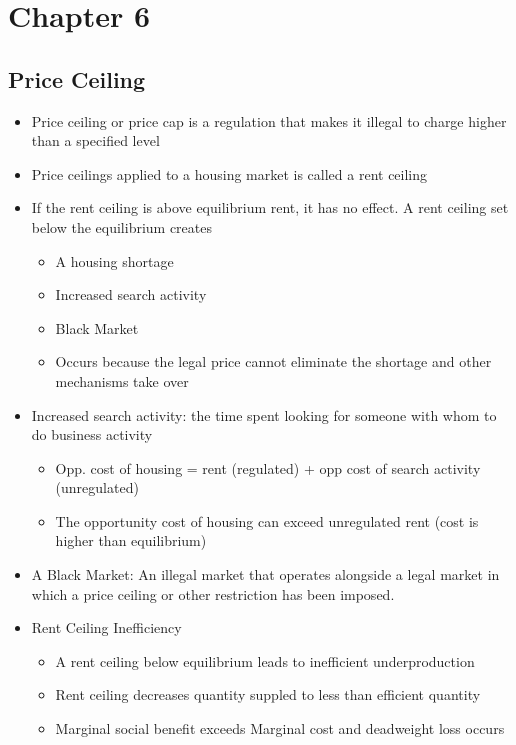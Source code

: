 \documentclass[11pt]{article}
\author{Sudhan Chitgopkar}
\date{\today}
\title{}
\begin{document}
\tableofcontents

\section{Chapter 6}
\label{sec:org15f45b9}
\subsection{Price Ceiling}
\label{sec:org0d3586f}
\begin{itemize}
\item Price ceiling or price cap is a regulation that makes it illegal to charge higher than a 
specified level
\item Price ceilings applied to a housing market is called a rent ceiling
\item If the rent ceiling is above equilibrium rent, it has no effect. 
A rent ceiling set below the equilibrium creates
\begin{itemize}
\item A housing shortage
\item Increased search activity
\item Black Market
\item Occurs because the legal price cannot eliminate the shortage and other mechanisms take over
\end{itemize}
\item Increased search activity: the time spent looking for someone with whom to do business activity
\begin{itemize}
\item Opp. cost of housing = rent (regulated) + opp cost of search activity (unregulated)
\item The opportunity cost of housing can exceed unregulated rent (cost is higher than equilibrium)
\end{itemize}
\item A Black Market: An illegal market that operates alongside a legal market in which a price ceiling
or other restriction has been imposed.
\item Rent Ceiling Inefficiency
\begin{itemize}
\item A rent ceiling below equilibrium leads to inefficient underproduction
\item Rent ceiling decreases quantity suppled to less than efficient quantity
\item Marginal social benefit exceeds Marginal cost and deadweight loss occurs
\end{itemize}

\end{itemize}
\end{document}
